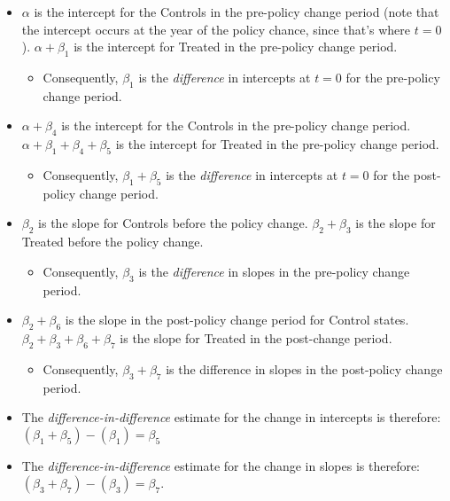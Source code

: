 \documentclass[12pt]{article}
\begin{document}
\begin{itemize}
  \item $\alpha$ is the intercept for the Controls in the pre-policy change period (note that the intercept occurs at the year of the policy chance, since that's where $t=0$).
  $\alpha + \beta_{1}$ is the intercept for Treated in the pre-policy change period.
  \begin{itemize}
    \item Consequently, $\beta_1$ is the \emph{difference} in intercepts at $t=0$ for the pre-policy change period.
  \end{itemize}
  \item $\alpha + \beta_4$ is the intercept for the Controls in the pre-policy change period. $\alpha + \beta_1 + \beta_4 + \beta_5$ is the intercept for Treated in the pre-policy change period.
  \begin{itemize}
    \item Consequently, $\beta_1 + \beta_5$ is the \emph{difference} in intercepts at $t=0$ for the post-policy change period.
  \end{itemize}
  \item $\beta_2$ is the slope for Controls before the policy change. $\beta_2 + \beta_3$ is the slope for Treated before the policy change.
\begin{itemize}
  \item Consequently, $\beta_{3}$ is the \emph{difference} in slopes in the pre-policy change period.
\end{itemize}
  \item $\beta_{2} + \beta_{6}$ is the slope in the post-policy change period for Control states. $\beta_{2} + \beta_{3} + \beta_{6} + \beta_{7}$ is the slope for Treated in the post-change period.
  \begin{itemize}
    \item Consequently, $\beta_{3} + \beta_{7}$ is the difference in slopes in the post-policy change period.
  \end{itemize}
  \item The \emph{difference-in-difference} estimate for the change in intercepts is therefore: \\
   $(\beta_1 + \beta_5) - (\beta_1) = \beta_5$
  \item The \emph{difference-in-difference} estimate for the change in slopes is therefore:\\
   $(\beta_{3} + \beta_{7}) - (\beta_{3}) = \beta_7$.
\end{itemize}
\end{document}
